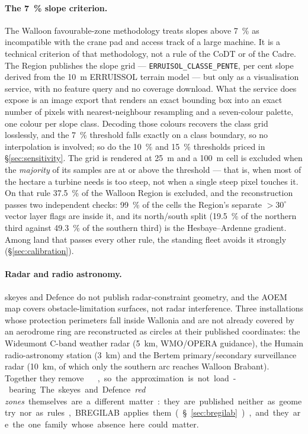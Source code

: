 \documentclass[11pt,a4paper]{article}
\begin{document}
\paragraph{The \SI{7}{\percent} slope criterion.} The Walloon favourable-zone
methodology treats slopes above \SI{7}{\percent} as incompatible with the crane
pad and access track of a large machine. It is a technical criterion of that
methodology, not a rule of the CoDT or of the Cadre. The Region publishes the
slope grid --- \texttt{ERRUISOL\_CLASSE\_PENTE}, per cent slope derived from the
\SI{10}{\metre} ERRUISSOL terrain model --- but only as a visualisation service,
with no feature query and no coverage download. What the service does expose is
an image export that renders an exact bounding box into an exact number of
pixels with nearest-neighbour resampling and a seven-colour palette, one colour
per slope class. Decoding those colours recovers the class grid losslessly, and
the \SI{7}{\percent} threshold falls exactly on a class boundary, so no
interpolation is involved; so do the \SI{10}{\percent} and \SI{15}{\percent}
thresholds priced in §\ref{sec:sensitivity}. The grid is rendered at
\SI{25}{\metre} and a \SI{100}{\metre} cell is excluded when the \emph{majority}
of its samples are at or above the threshold --- that is, when most of the
hectare a turbine needs is too steep, not when a single steep pixel touches it.
On that rule \SI{37.5}{\percent} of the Walloon Region is excluded, and the
reconstruction passes two independent checks: \SI{99}{\percent} of the cells the
Region's separate $>30^\circ$ vector layer flags are inside it, and its
north/south split (\SI{19.5}{\percent} of the northern third against
\SI{49.3}{\percent} of the southern third) is the Hesbaye--Ardenne gradient.
Among land that passes every other rule, the standing fleet avoids it strongly
(§\ref{sec:calibration}).

\paragraph{Radar and radio astronomy.} skeyes and Defence do not publish
radar-constraint geometry, and the AOEM map covers obstacle-limitation surfaces,
not radar interference. Three installations whose protection perimeters fall
inside Wallonia and are not already covered by an aerodrome ring are
reconstructed as circles at their published coordinates: the Wideumont C-band
weather radar (\SI{5}{\kilo\metre}, WMO/OPERA guidance), the Humain
radio-astronomy station (\SI{3}{\kilo\metre}) and the Bertem primary/secondary
surveillance radar (\SI{10}{\kilo\metre}, of which only the southern arc reaches
Walloon Brabant). Together they remove \ServRadarRemoved{}~\si{\square
\kilo\metre}, so the approximation is not load-bearing. The skeyes and Defence
\emph{red zones} themselves are a different matter: they are published neither
as geometry nor as rules, BREGILAB applies them (§\ref{sec:bregilab}), and they
are the one family whose absence here could matter.
\end{document}
